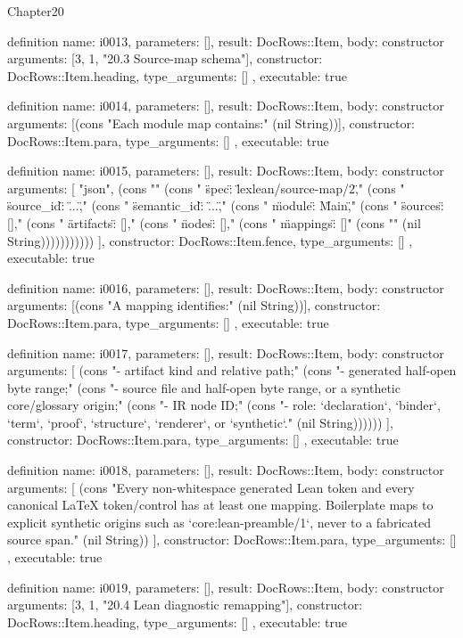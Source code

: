 \begin{lexlean}{Chapter20}
\begin{semanticmodule}
definition{
  name: i0013,
  parameters: [],
  result: DocRows::Item,
  body: constructor{
    arguments: [3, 1, "20.3 Source-map schema"],
    constructor: DocRows::Item.heading,
    type_arguments: []
  },
  executable: true
}

definition{
  name: i0014,
  parameters: [],
  result: DocRows::Item,
  body: constructor{
    arguments: [(cons "Each module map contains:" (nil String))],
    constructor: DocRows::Item.para,
    type_arguments: []
  },
  executable: true
}

definition{
  name: i0015,
  parameters: [],
  result: DocRows::Item,
  body: constructor{
    arguments: [
      "json",
      (cons "{" (cons "  \"spec\": \"lexlean/source-map/2\"," (cons "  \"source_id\": \"...\"," (cons "  \"semantic_id\": \"...\"," (cons "  \"module\": \"Main\"," (cons "  \"sources\": []," (cons "  \"artifacts\": []," (cons "  \"nodes\": []," (cons "  \"mappings\": []" (cons "}" (nil String)))))))))))
    ],
    constructor: DocRows::Item.fence,
    type_arguments: []
  },
  executable: true
}

definition{
  name: i0016,
  parameters: [],
  result: DocRows::Item,
  body: constructor{
    arguments: [(cons "A mapping identifies:" (nil String))],
    constructor: DocRows::Item.para,
    type_arguments: []
  },
  executable: true
}

definition{
  name: i0017,
  parameters: [],
  result: DocRows::Item,
  body: constructor{
    arguments: [
      (cons "- artifact kind and relative path;" (cons "- generated half-open byte range;" (cons "- source file and half-open byte range, or a synthetic core/glossary origin;" (cons "- IR node ID;" (cons "- role: `declaration`, `binder`, `term`, `proof`, `structure`, `renderer`, or `synthetic`." (nil String))))))
    ],
    constructor: DocRows::Item.para,
    type_arguments: []
  },
  executable: true
}

definition{
  name: i0018,
  parameters: [],
  result: DocRows::Item,
  body: constructor{
    arguments: [
      (cons "Every non-whitespace generated Lean token and every canonical LaTeX token/control has at least one mapping. Boilerplate maps to explicit synthetic origins such as `core:lean-preamble/1`, never to a fabricated source span." (nil String))
    ],
    constructor: DocRows::Item.para,
    type_arguments: []
  },
  executable: true
}

definition{
  name: i0019,
  parameters: [],
  result: DocRows::Item,
  body: constructor{
    arguments: [3, 1, "20.4 Lean diagnostic remapping"],
    constructor: DocRows::Item.heading,
    type_arguments: []
  },
  executable: true
}


\end{semanticmodule}
\end{lexlean}
